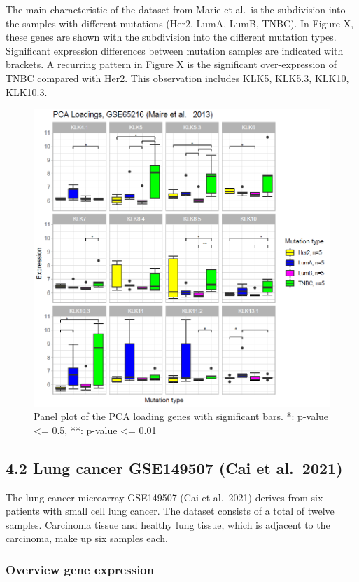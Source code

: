 \documentclass[
]{article}
\begin{document}
The main characteristic of the dataset from Marie et al.~is the
subdivision into the samples with different mutations (Her2, LumA, LumB,
TNBC). In Figure X, these genes are shown with the subdivision into the
different mutation types. Significant expression differences between
mutation samples are indicated with brackets. A recurring pattern in
Figure X is the significant over-expression of TNBC compared with Her2.
This observation includes KLK5, KLK5.3, KLK10, KLK10.3.

\begin{figure}

{\centering \includegraphics[width=0.5\linewidth]{images/breast_panel_loadings_test} 

}

\caption{Panel plot of the PCA loading genes with significant bars. *: p-value <= 0.5, **: p-value <= 0.01 }\label{fig:Hypothesis test panel plot with significant bars}
\end{figure}

\hypertarget{lung-cancer-gse149507-cai-et-al.-2021}{%
\subsection{4.2 Lung cancer GSE149507 (Cai et
al.~2021)}\label{lung-cancer-gse149507-cai-et-al.-2021}}

The lung cancer microarray GSE149507 (Cai et al.~2021) derives from six
patients with small cell lung cancer. The dataset consists of a total of
twelve samples. Carcinoma tissue and healthy lung tissue, which is
adjacent to the carcinoma, make up six samples each.

\hypertarget{overview-gene-expression-1}{%
\subsubsection{Overview gene
expression}\label{overview-gene-expression-1}}
\end{document}
